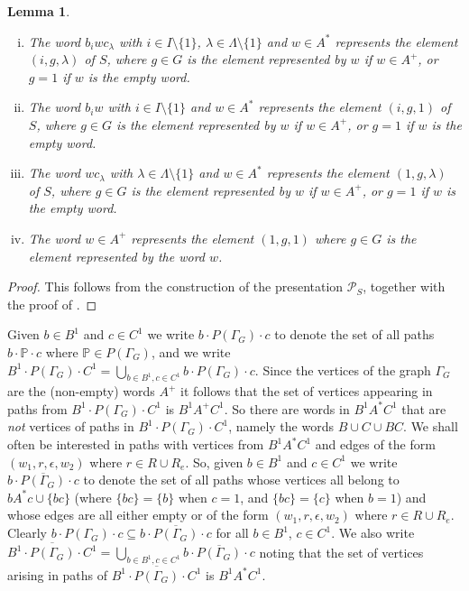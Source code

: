 \documentclass[11pt]{amsart}
\newtheorem{lem}{Lemma}
\theoremstyle{plain}
\begin{document}
\begin{lem}\label{dagger}
\ \

\begin{enumerate}[(i)]
\item The word $b_i w c_\lambda$ with $i \in I \setminus \{ 1 \}$, $\lambda \in \Lambda \setminus \{ 1 \}$ and $w \in A^*$ represents the element $(i,g,\lambda)$ of $S$, where $g \in G$ is the element represented by $w$ if $w \in A^+$, or $g=1$ if $w$ is the empty word.
\item The word $b_i w$ with $i \in I \setminus \{ 1 \}$ and $w \in A^*$ represents the element $(i,g,1)$ of $S$, where $g \in G$ is the element represented by $w$ if $w \in A^+$, or $g=1$ if $w$ is the empty word.
\item The word $w c_\lambda$ with $\lambda \in \Lambda \setminus \{ 1 \}$ and $w \in A^*$ represents the element $(1,g,\lambda)$ of $S$, where $g \in G$ is the element represented by $w$ if $w \in A^+$, or $g=1$ if $w$ is the empty word.
\item The word $w \in A^+$ represents the element $(1,g,1)$ where $g \in G$ is the element represented by the word $w$. 
\end{enumerate} 
\end{lem}
\begin{proof}
This follows from the construction of the presentation $\mathcal{P}_S$, together with the proof of \cite[Theorem~6.2]{HowieAndRuskuc}. 
\end{proof}

Given $b \in B^1$ and $c \in C^1$ we write $b \cdot P(\Gamma_G) \cdot c$ to denote the set of all paths $b \cdot {\mathbb{P}} \cdot c$ where ${\mathbb{P}} \in P(\Gamma_G)$, and we write 
$
B^1 \cdot P(\Gamma_G) \cdot C^1 = \bigcup_{b \in B^1, c \in C^1}{ b \cdot P(\Gamma_G) \cdot c}.
$
Since the vertices of the graph $\Gamma_G$ are the (non-empty) words $A^+$ it follows that the set of vertices appearing in paths from $B^1 \cdot P(\Gamma_G) \cdot C^1$ is $B^1 A^+ C^1$. So there are words in $B^1 A^* C^1$ that are \emph{not} vertices of paths in $B^1 \cdot P(\Gamma_G) \cdot C^1$, namely the words $B \cup C \cup BC$. We shall often be interested in paths with vertices from $B^1 A^* C^1$ and edges of the form $(w_1, r, \epsilon, w_2)$ where $r \in R \cup R_e$. So, given $b \in B^1$ and $c \in C^1$ we write $\overline{b \cdot P(\Gamma_G) \cdot c}$ to denote the set of all paths whose vertices all belong to $b A^* c \cup \{ bc \}$ (where $\{bc\} = \{b\}$ when $c=1$, and $\{bc\} = \{c\}$ when $b=1$) and whose edges are all either empty or of the form $(w_1, r, \epsilon, w_2)$ where $r \in R \cup R_e$. Clearly $b \cdot P(\Gamma_G) \cdot c \subseteq \overline{b \cdot P(\Gamma_G) \cdot c}$ for all $b \in B^1$, $c \in C^1$. We also write 
$
\overline{B^1 \cdot P(\Gamma_G) \cdot C^1} = \bigcup_{b \in B^1, c \in C^1}{ \overline{b \cdot P(\Gamma_G) \cdot c}}
$
noting that the set of vertices arising in paths of $\overline{B^1 \cdot P(\Gamma_G) \cdot C^1}$ is $B^1 A^* C^1$. 
\end{document}

